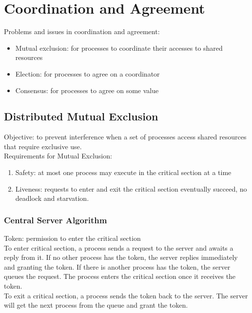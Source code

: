 \chapter{Coordination and Agreement}
\begin{multicols*}{2}

\noindent Problems and issues in coordination and agreement:
\begin{itemize}
  \item Mutual exclusion: for processes to coordinate their accesses to shared resources
  \item Election: for processes to agree on a coordinator
  \item Consensus: for processes to agree on some value
\end{itemize}

\section{Distributed Mutual Exclusion}

\noindent Objective: to prevent interference when a set of processes access shared resources that require exclusive use.\\

\noindent Requirements for Mutual Exclusion:
\begin{enumerate}
  \item Safety: at most one process may execute in the critical section at a time
  \item Liveness: requests to enter and exit the critical section eventually succeed, no deadlock and starvation. 
\end{enumerate}

\subsection{Central Server Algorithm}

\noindent Token: permission to enter the critical section\\

\noindent To enter critical section, a process sends a request to the server and awaits a reply from it. If no other process has the token, the server replies immediately and granting the token. If there is another process has the token, the server queues the request. The process enters the critical section once it receives the token.\\

\noindent To exit a critical section, a process sends the token back to the server. The server will get the next process from the queue and grant the token.\\


\end{multicols*}
